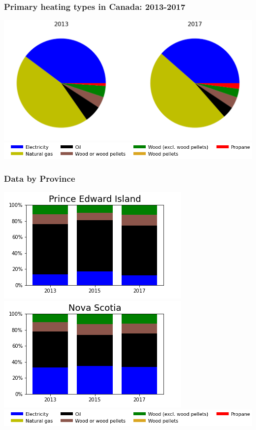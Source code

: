 \documentclass{beamer}
\begin{document}
\begin{frame}
\frametitle{Primary heating types in Canada: 2013-2017}
\begin{center}
\includegraphics[width=\textwidth]{Canada20132017.png}\\
\includegraphics[width=0.8\linewidth]{leg_bar.png}
\end{center}
\end{frame}



\begin{frame}
\frametitle{Data by Province}
\begin{center}
\includegraphics[width=0.5\linewidth]{pe.png}%
\includegraphics[width=0.5\linewidth]{ns.png}\\
\includegraphics[width=0.8\linewidth]{leg_bar.png}
\end{center}
\end{frame}
\end{document}
